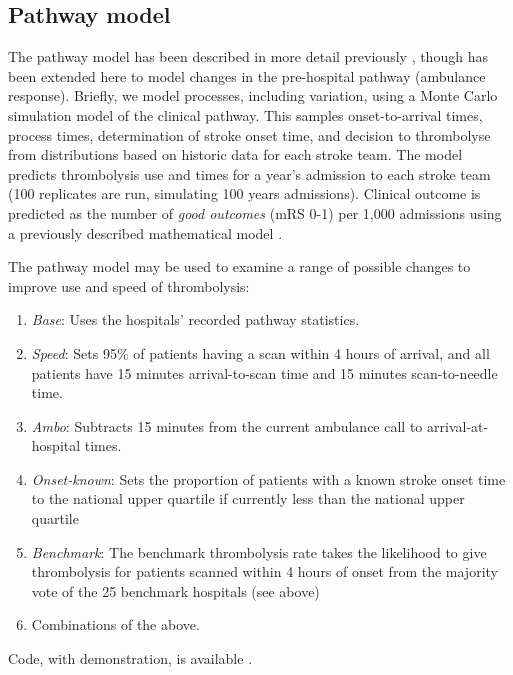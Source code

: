 \subsection{Pathway model}

The pathway model has been described in more detail previously \cite{allen_use_2022}, though has been extended here to model changes in the pre-hospital pathway (ambulance response). Briefly, we model processes, including variation, using a Monte Carlo simulation model of the clinical pathway. This samples onset-to-arrival times, process times, determination of stroke onset time, and decision to thrombolyse from distributions based on historic data for each stroke team. The model predicts thrombolysis use and times for a year's admission to each stroke team (100 replicates are run, simulating 100 years admissions). Clinical outcome is predicted as the number of \textit{good outcomes} (mRS 0-1) per 1,000 admissions using a previously described mathematical model \cite{allen_estimation_2020}.

The pathway model may be used to examine a range of possible changes to improve use and speed of thrombolysis:

\begin{enumerate}

    \item \textit{Base}: Uses the hospitals’ recorded pathway statistics.

    \item \textit{Speed}: Sets 95\% of patients having a scan within 4 hours of arrival, and all patients have 15 minutes arrival-to-scan time and 15 minutes scan-to-needle time.

    \item \textit{Ambo}: Subtracts 15 minutes from the current ambulance call to arrival-at-hospital times.

    \item  \textit{Onset-known}: Sets the proportion of patients with a known stroke onset time to the national upper quartile if currently less than the national upper quartile 

    \item \textit{Benchmark}: The benchmark thrombolysis rate takes the likelihood to give thrombolysis for patients scanned within 4 hours of onset from the majority vote of the 25 benchmark hospitals (see above)

    \item Combinations of the above.
    
\end{enumerate}

Code, with demonstration, is available \cite{allen_samuel_code_2024}.